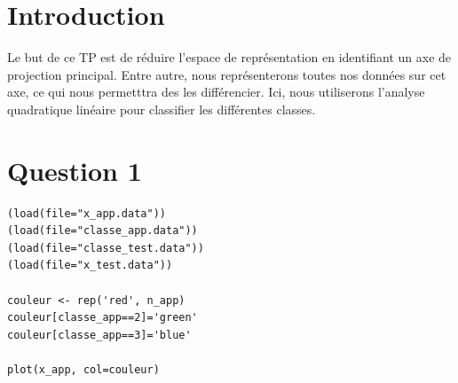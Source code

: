 \documentclass[a4paper,12pt]{report}
\begin{document}


\setcounter{page}{1} 
\newpage

\section*{Introduction}

Le but de ce TP est de réduire l'espace de représentation en identifiant un axe de projection principal. Entre autre, nous représenterons toutes nos données sur cet axe, ce qui nous permetttra des les différencier. Ici, nous utiliserons l'analyse quadratique linéaire pour classifier les différentes classes.
	
\section*{Question 1}

\begin{lstlisting}
(load(file="x_app.data"))
(load(file="classe_app.data"))
(load(file="classe_test.data"))
(load(file="x_test.data"))

couleur <- rep('red', n_app)
couleur[classe_app==2]='green'
couleur[classe_app==3]='blue'

plot(x_app, col=couleur)
\end{lstlisting}
\end{document}
